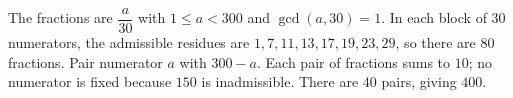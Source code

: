 The fractions are $\dfrac{a}{30}$ with $1\le a<300$ and $\gcd(a,30)=1$. In each block of $30$ numerators, the admissible residues are $1,7,11,13,17,19,23,29$, so there are $80$ fractions. Pair numerator $a$ with $300-a$. Each pair of fractions sums to $10$; no numerator is fixed because $150$ is inadmissible. There are $40$ pairs, giving $\boxed{400}$.
